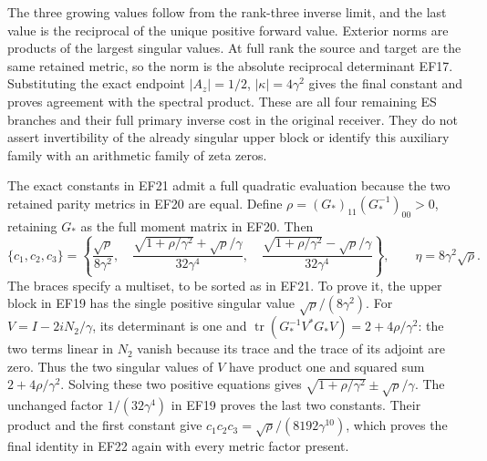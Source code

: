 \documentclass[11pt]{article}
\begin{document}
The three growing values follow from the rank-three
inverse limit, and the last value is the reciprocal
of the unique positive forward value. Exterior norms
are products of the largest singular values. At full
rank the source and target are the same retained
metric, so the norm is the absolute reciprocal
determinant EF17. Substituting the exact endpoint
$|A_z|=1/2$, $|\kappa|=4\gamma^2$ gives the final
constant and proves agreement with the spectral product.
These are all four remaining ES branches and their
full primary inverse cost in the original receiver.
They do not assert invertibility of the already
singular upper block or identify this auxiliary
family with an arithmetic family of zeta zeros.

The exact constants in EF21 admit a full quadratic
evaluation because the two retained parity metrics
in EF20 are equal. Define
$\rho=(G_*)_{11}(G_*^{-1})_{00}>0$, retaining $G_*$
as the full moment matrix in EF20. Then
\begin{equation}
 \{c_1,c_2,c_3\}=\left\{
 \frac{\sqrt\rho}{8\gamma^2},\quad
 \frac{\sqrt{1+\rho/\gamma^2}+\sqrt\rho/\gamma}{32\gamma^4},\quad
 \frac{\sqrt{1+\rho/\gamma^2}-\sqrt\rho/\gamma}{32\gamma^4}
 \right\},\qquad \eta=8\gamma^2\sqrt\rho.
 \tag{EF23}
\end{equation}
The braces specify a multiset, to be sorted as in EF21.
To prove it, the upper block in EF19 has the single
positive singular value $\sqrt\rho/(8\gamma^2)$.
For $V=I-2iN_2/\gamma$, its determinant is one and
$\operatorname{tr}(G_*^{-1}V^*G_*V)=2+4\rho/\gamma^2$:
the two terms linear in $N_2$ vanish because its trace
and the trace of its adjoint are zero. Thus the two
singular values of $V$ have product one and squared
sum $2+4\rho/\gamma^2$. Solving these two positive
equations gives $\sqrt{1+\rho/\gamma^2}\pm\sqrt\rho/\gamma$.
The unchanged factor $1/(32\gamma^4)$ in EF19 proves
the last two constants. Their product and the first
constant give $c_1c_2c_3=\sqrt\rho/(8192\gamma^{10})$,
which proves the final identity in EF22 again with
every metric factor present.
\end{document}

